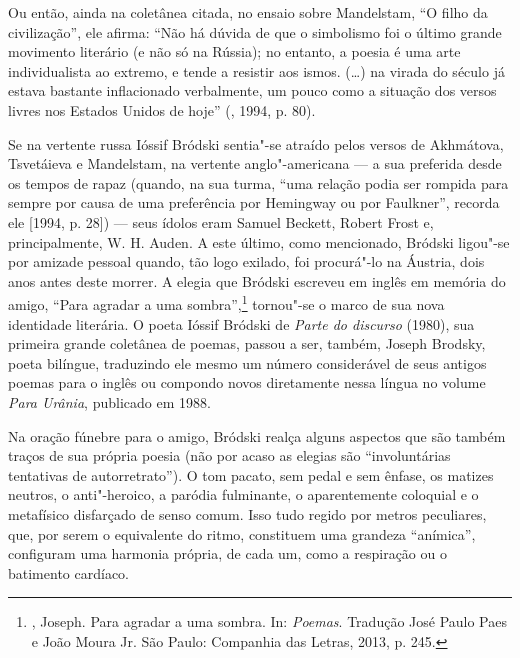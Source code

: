 Ou então, ainda na coletânea citada, no ensaio sobre Mandelstam, ``O filho da civilização'', ele
afirma: ``Não há dúvida de que o simbolismo foi o último grande movimento literário (e não
só na Rússia); no entanto, a poesia é uma arte
individualista ao extremo, e tende a resistir aos ismos. (\ldots{}) na virada do século já 
estava bastante inflacionado verbalmente, um pouco como a situação
 dos versos livres nos Estados Unidos de hoje'' (, 1994, p. 80). 

Se na vertente russa Ióssif Bródski sentia"-se atraído pelos versos de
Akhmátova, Tsvetáieva e Mandelstam, na vertente anglo"-americana --- a sua
preferida desde os tempos de rapaz (quando, na sua turma,
``uma relação podia ser rompida para sempre por causa de uma preferência
por Hemingway ou por Faulkner'', recorda ele [1994, p. 28]) --- seus ídolos eram Samuel
Beckett, Robert Frost e, principalmente, W. H. Auden. A este último, como mencionado, Bródski ligou"-se por amizade pessoal quando, tão logo exilado, foi procurá"-lo
na Áustria, dois anos antes deste morrer. A
elegia que Bródski escreveu em inglês em memória do amigo, ``Para
agradar a uma sombra'',\footnote{, Joseph. Para agradar a uma sombra.
 In:  \emph{Poemas}. Tradução José Paulo Paes e 
João Moura Jr. São Paulo: Companhia das Letras, 2013, p. 245.} tornou"-se o marco de sua nova identidade
literária. O poeta Ióssif Bródski de \emph{Parte do discurso} (1980), sua primeira grande coletânea de poemas, passou a ser, também, Joseph Brodsky, poeta bilíngue, traduzindo ele mesmo um
número considerável de seus antigos poemas para o inglês ou compondo
novos diretamente nessa língua no volume \emph{Para Urânia},
publicado em 1988.

Na oração fúnebre para o amigo, Bródski realça alguns
aspectos que são também traços de sua própria poesia (não por acaso as elegias são
``involuntárias tentativas de autorretrato''). O tom pacato,
sem pedal e sem ênfase, os matizes neutros, o anti"-heroico, a paródia
fulminante, o aparentemente coloquial e o metafísico disfarçado de senso
comum. Isso tudo regido por metros peculiares, que, por serem o
equivalente do ritmo, constituem uma grandeza ``anímica'', configuram uma
harmonia própria, de cada um, como a respiração ou o batimento cardíaco.

